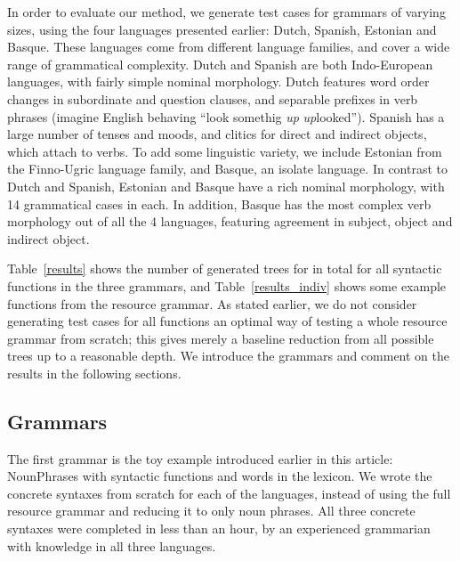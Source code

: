 In order to evaluate our method, we generate test cases for grammars
of varying sizes, using the four languages presented earlier: Dutch, Spanish,
Estonian and Basque. These languages come from different language
families, and cover a wide range of grammatical complexity. Dutch and
Spanish are both Indo-European languages, with fairly simple nominal
morphology. Dutch features word order changes in subordinate and
question clauses, and separable prefixes in verb phrases (imagine
English behaving ``look somethig \emph{up} \~ \emph{up}looked''). 
Spanish has a large number of tenses and moods, and clitics for direct
and indirect objects, which attach to verbs.  To add some linguistic
variety, we include Estonian from the Finno-Ugric language family, and
Basque, an isolate language.  In contrast to Dutch and Spanish,
Estonian and Basque have a rich nominal morphology, with 14
grammatical cases in each. In addition, Basque has the most complex
verb morphology out of all the 4 languages, featuring agreement in
subject, object and indirect object.


Table~\ref{results} shows the number of generated trees for 
in total for all syntactic functions in the three grammars, and
Table~\ref{results_indiv} shows some example functions from the resource grammar. 
As stated earlier, we do not consider generating test cases for all
functions an optimal way of testing a whole resource grammar from scratch;
this gives merely a baseline reduction from all possible trees up to a
reasonable depth. We introduce the grammars and comment on the results
in the following sections. 

\subsection{Grammars}

The first grammar is the toy example introduced earlier in this
article: NounPhrases with \numOfFun syntactic functions and \numOfLex words in the
lexicon. We wrote the concrete syntaxes from scratch for each of the
languages, instead of using the full resource grammar and reducing it
to only noun phrases. All three concrete syntaxes were completed
in less than an hour, by an experienced grammarian with knowledge in
all three languages.

